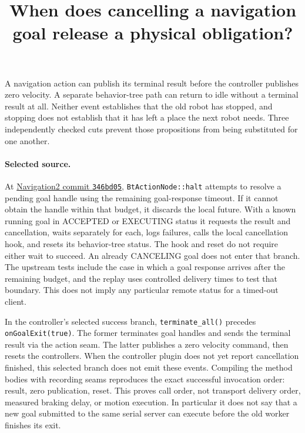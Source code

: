 \documentclass{article}
\title{When does cancelling a navigation goal release a physical obligation?}
\begin{document}
\maketitle

A navigation action can publish its terminal result before the controller publishes zero velocity. A separate behavior-tree path can return to idle without a terminal result at all. Neither event establishes that the old robot has stopped, and stopping does not establish that it has left a place the next robot needs. Three independently checked cuts prevent those propositions from being substituted for one another.

\paragraph{Selected source.}
At \href{https://github.com/ros-navigation/navigation2/tree/346bd05f40b62ae60b96ba86e02eb491c8dba444}{Navigation2 commit \texttt{346bd05}}, \texttt{BtActionNode::halt} attempts to resolve a pending goal handle using the remaining goal-response timeout. If it cannot obtain the handle within that budget, it discards the local future. With a known running goal in ACCEPTED or EXECUTING status it requests the result and cancellation, waits separately for each, logs failures, calls the local cancellation hook, and resets its behavior-tree status. The hook and reset do not require either wait to succeed. An already CANCELING goal does not enter that branch. The upstream tests include the case in which a goal response arrives after the remaining budget, and the replay uses controlled delivery times to test that boundary. This does not imply any particular remote status for a timed-out client.

In the controller's selected success branch, \texttt{terminate\_all()} precedes \texttt{onGoalExit(true)}. The former terminates goal handles and sends the terminal result via the action seam. The latter publishes a zero velocity command, then resets the controllers. When the controller plugin does not yet report cancellation finished, this selected branch does not emit these events. Compiling the method bodies with recording seams reproduces the exact successful invocation order: result, zero publication, reset. This proves call order, not transport delivery order, measured braking delay, or motion execution. In particular it does not say that a new goal submitted to the same serial server can execute before the old worker finishes its exit.
\end{document}
